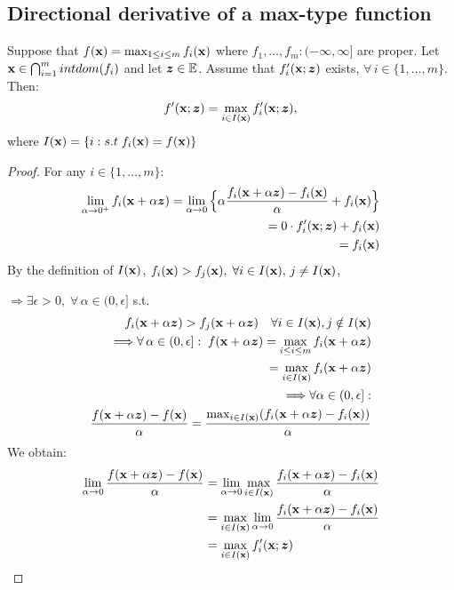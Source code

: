 \documentclass[11pt]{article}
\begin{document}
\subsection{Directional derivative of a max-type function}

\begin{theorem}
    Suppose that $f({\mathbf{x}}) = \max_{1\le i \le m} f_i({\mathbf{x}})$ where $f_1, \ldots ,f_m:
    (-\infty,\infty]$ are proper. Let ${\mathbf{x}} \in \bigcap_{i=1}^{m} intdom(f_i)$ and let ${\bm{z}} \in \mathbb{E}$.
    Assume that $f_i'({\mathbf{x}};{\bm{z}})$ exists, $\forall \, i \in \{ 1, \ldots ,m \}$. Then:
    \begin{align*}
        f'({\mathbf{x}};{\bm{z}}) = \max_{i \in I({\mathbf{x}})}f_i'({\mathbf{x}};{\bm{z}}),
    \end{align*}
    where $I({\mathbf{x}}) = \{ i: s.t \; f_i({\mathbf{x}}) = f({\mathbf{x}}) \}$
\end{theorem}
\begin{proof}
    For any $i \in \{ 1, \ldots ,m \}$:
    \begin{align*}
        \lim_{\alpha \to 0^{+}}f_i({\mathbf{x}} + \alpha {\bm{z}}) = \lim_{\alpha \to 0}
        \Big\{ \alpha \frac{f_i({\mathbf{x}} + \alpha {\bm{z}}) - f_i({\mathbf{x}})}{\alpha} + f_i({\mathbf{x}}) \Big\}\\
        = 0 \cdot f_i'({\mathbf{x}}; {\bm{z}}) + f_i({\mathbf{x}})\\
        = f_i({\mathbf{x}})
    \end{align*}
    By the definition of $I({\mathbf{x}})$, $f_i({\mathbf{x}}) > f_j({\mathbf{x}}), \; \forall i \in I({\mathbf{x}}), \, j\neq I({\mathbf{x}})$,

    $\Longrightarrow \exists \epsilon > 0,\; \forall \,\alpha \in (0,\epsilon]$ s.t. 
    \begin{align*}
        f_i({\mathbf{x}} + \alpha{\bm{z}}) > f_j({\mathbf{x}} + \alpha{\bm{z}}) \quad \forall  i \in I({\mathbf{x}}), j \notin I({\mathbf{x}})\\
        \Longrightarrow \forall  \, \alpha \in (0,\epsilon]:
        \; f({\mathbf{x}} + \alpha{\bm{z}}) = \max_{i \le i \le m} f_i({\mathbf{x}} + \alpha{\bm{z}}) \\
        = \max_{i \in I({\mathbf{x}})}f_i({\mathbf{x}} + \alpha{\bm{z}})\\
        \Longrightarrow\forall \alpha \in (0,\epsilon]:\\
        \frac{f({\mathbf{x}} + \alpha{\bm{z}}) - f({\mathbf{x}})}{\alpha} = 
        \frac{\max_{i \in I({\mathbf{x}})}(f_i({\mathbf{x}}+\alpha{\bm{z}}) - f_i({\mathbf{x}}))}{\alpha}
    \end{align*}
    We obtain:
    \begin{align*}
        \lim_{\alpha \to 0}\frac{f({\mathbf{x}} + \alpha{\bm{z}}) - f({\mathbf{x}})}{\alpha} &= 
        \lim_{\alpha \to 0}\max_{i \in I({\mathbf{x}})}\frac{f_i({\mathbf{x}} + \alpha{\bm{z}}) - f_i({\mathbf{x}})}{\alpha}\\
        &= \max_{i \in I({\mathbf{x}})}\lim_{\alpha \to 0}\frac{f_i({\mathbf{x}} + \alpha{\bm{z}}) - f_i({\mathbf{x}})}{\alpha} \\
        &= \max_{i \in I({\mathbf{x}})}f_i'({\mathbf{x}}; {\bm{z}})
    \end{align*}
\end{proof}
\end{document}
